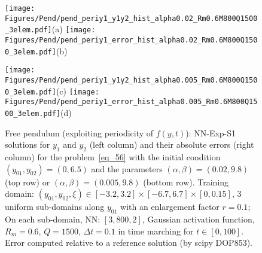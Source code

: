 
\begin{figure}
  \centerline{
    \texttt{[image: Figures/Pend/pend\_periy1\_y1y2\_hist\_alpha0.02\_Rm0.6M800Q1500\_3elem.pdf]}(a)
    \texttt{[image: Figures/Pend/pend\_periy1\_error\_hist\_alpha0.02\_Rm0.6M800Q1500\_3elem.pdf]}(b)
    }
  \centerline{
    \texttt{[image: Figures/Pend/pend\_periy1\_y1y2\_hist\_alpha0.005\_Rm0.6M800Q1500\_3elem.pdf]}(c)
    \texttt{[image: Figures/Pend/pend\_periy1\_error\_hist\_alpha0.005\_Rm0.6M800Q1500\_3elem.pdf]}(d)
  }
  \caption{Free pendulum (exploiting periodicity of $f(y,t)$):
    NN-Exp-S1 solutions for $y_1$ and $y_2$ (left column) and their absolute errors (right column)
    for the problem~\eqref{eq_56} with the initial condition $(y_{01},y_{02})=(0,6.5)$ and
    the parameters $(\alpha,\beta)=(0.02,9.8)$ (top row)
    or $(\alpha,\beta)=(0.005,9.8)$ (bottom row).
    Training domain: $(y_{01},y_{02},\xi)\in[-3.2,3.2]\times[-6.7,6.7]\times[0,0.15]$,
    $3$ uniform sub-domains along $y_{01}$ with an enlargement factor $r=0.1$;
    On each sub-domain, NN: $[3,800,2]$,
    Gaussian activation function, $R_m=0.6$, $Q=1500$,
    $\Delta t=0.1$ in time marching for $t\in[0,100]$.
    Error computed relative to a reference solution (by scipy DOP853).
  }
  \label{fg_12}
\end{figure}

